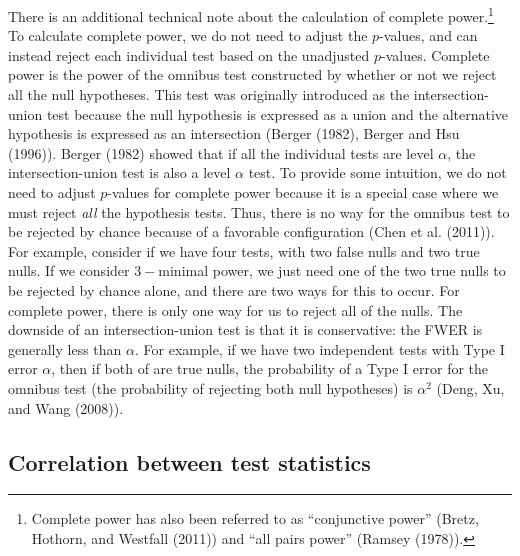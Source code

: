 \documentclass[
]{article}
\begin{document}
There is an additional technical note about the calculation of complete
power.\footnote{Complete power has also been referred to as
  ``conjunctive power'' (Bretz, Hothorn, and Westfall (2011)) and ``all
  pairs power'' (Ramsey (1978)).} To calculate complete power, we do not
need to adjust the \(p\)-values, and can instead reject each individual
test based on the unadjusted \(p\)-values. Complete power is the power
of the omnibus test constructed by whether or not we reject all the null
hypotheses. This test was originally introduced as the
intersection-union test because the null hypothesis is expressed as a
union and the alternative hypothesis is expressed as an intersection
(Berger (1982), Berger and Hsu (1996)). Berger (1982) showed that if all
the individual tests are level \(\alpha\), the intersection-union test
is also a level \(\alpha\) test. To provide some intuition, we do not
need to adjust \(p\)-values for complete power because it is a special
case where we must reject \emph{all} the hypothesis tests. Thus, there
is no way for the omnibus test to be rejected by chance because of a
favorable configuration (Chen et al. (2011)). For example, consider if
we have four tests, with two false nulls and two true nulls. If we
consider \(3-\)minimal power, we just need one of the two true nulls to
be rejected by chance alone, and there are two ways for this to occur.
For complete power, there is only one way for us to reject all of the
nulls. The downside of an intersection-union test is that it is
conservative: the FWER is generally less than \(\alpha\). For example,
if we have two independent tests with Type I error \(\alpha\), then if
both of are true nulls, the probability of a Type I error for the
omnibus test (the probability of rejecting both null hypotheses) is
\(\alpha^2\) (Deng, Xu, and Wang (2008)).

\subsection{Correlation between test statistics}
\label{sec:corr}
\end{document}

